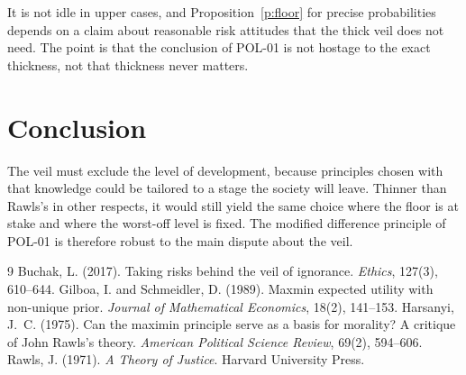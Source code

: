\documentclass{situationist-preprint}
\begin{document}
\begin{reply}
It is not idle in upper cases, and Proposition~\ref{p:floor} for precise probabilities depends on a claim about reasonable risk attitudes that the thick veil does not need. The point is that the conclusion of POL-01 is not hostage to the exact thickness, not that thickness never matters.
\end{reply}

\section{Conclusion}

The veil must exclude the level of development, because principles chosen with that knowledge could be tailored to a stage the society will leave. Thinner than Rawls's in other respects, it would still yield the same choice where the floor is at stake and where the worst-off level is fixed. The modified difference principle of POL-01 is therefore robust to the main dispute about the veil.

\begin{thebibliography}{9}
 Buchak, L. (2017). Taking risks behind the veil of ignorance. \emph{Ethics}, 127(3), 610--644.
 Gilboa, I. and Schmeidler, D. (1989). Maxmin expected utility with non-unique prior. \emph{Journal of Mathematical Economics}, 18(2), 141--153.
 Harsanyi, J.~C. (1975). Can the maximin principle serve as a basis for morality? A critique of John Rawls's theory. \emph{American Political Science Review}, 69(2), 594--606.
 Rawls, J. (1971). \emph{A Theory of Justice}. Harvard University Press.
\end{thebibliography}
\end{document}
